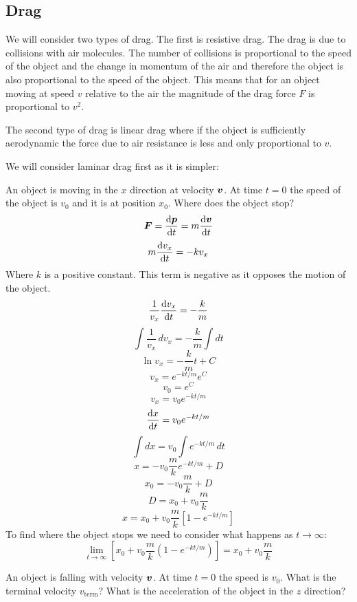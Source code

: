 \documentclass{article}
\begin{document}
    \subsection{Drag}
    We will consider two types of drag.
    The first is resistive drag.
    The drag is due to collisions with air molecules.
    The number of collisions is proportional to the speed of the object and the change in momentum of the air and therefore the object is also proportional to the speed of the object.
    This means that for an object moving at speed \(v\) relative to the air the magnitude of the drag force \(F\) is proportional to \(v^2\).
    
    The second type of drag is linear drag where if the object is sufficiently aerodynamic the force due to air resistance is less and only proportional to \(v\).
    
    We will consider laminar drag first as it is simpler:
    
    \example
    An object is moving in the \(x\) direction at velocity \(\bm{v}\).
    At time \(t = 0\) the speed of the object is \(v_0\) and it is at position \(x_0\).
    Where does the object stop?
    \[\bm{F} = \dv{\bm{p}}{t} = m\dv{\bm{v}}{t}\]
    \[m\dv{v_x}{t} = -k v_x\]
    Where \(k\) is a positive constant.
    This term is negative as it opposes the motion of the object.
    \[\frac{1}{v_x}\dv{v_x}{t} = -\frac{k}{m}\]
    \[\int \frac{1}{v_x}\,dv_x = -\frac{k}{m}\int dt\]
    \[\ln v_x = -\frac{k}{m}t + C\]
    \[v_x = e^{-kt/m}e^C\]
    \[v_0 = e^C\]
    \[v_x = v_0e^{-kt/m}\]
    \[\dv{x}{t} = v_0e^{-kt/m}\]
    \[\int dx = v_0\int e^{-kt/m}\,dt\]
    \[x = -v_0\frac{m}{k}e^{-kt/m} + D\]
    \[x_0 = -v_0\frac{m}{k} + D\]
    \[D = x_0 + v_0\frac{m}{k}\]
    \[x = x_0 + v_0\frac{m}{k}\left[1 - e^{-kt/m}\right]\]
    To find where the object stops we need to consider what happens as \(t \to \infty\):
    \[\lim_{t\to\infty}\left[x_0 + v_0\frac{m}{k}\left(1 - e^{-kt/m}\right)\right] = x_0 + v_0\frac{m}{k}\]
    
    \example
    An object is falling with velocity \(\bm{v}\).
    At time \(t = 0\) the speed is \(v_0\).
    What is the terminal velocity \(v_\text{term}\)?
    What is the acceleration of the object in the \(z\) direction?
    
\end{document}
